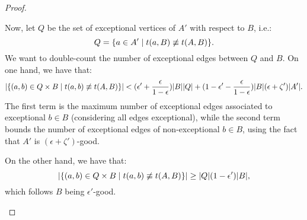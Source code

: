 \begin{lemma}
\begin{proof}
\begin{enumerate}[label=(\alph*), ref=\alph*]
                    Now, let $Q$ be the set of exceptional vertices of $A'$ with respect to $B$, i.e.:
                    \[
                        Q = \{ a \in A' \mid t(a, B) \not\equiv t(A, B) \}.
                    \]
                    We want to double-count the number of exceptional edges between $Q$ and $B$.
                    On one hand, we have that:
                    \[
                        | \{ (a,b) \in Q \times B \mid t(a, b) \not\equiv t(A, B) \} | <
                        ( \epsilon' + \frac{\epsilon}{1 - \epsilon} ) | B | | Q | +
                        ( 1 - \epsilon' - \frac{\epsilon}{1 - \epsilon} ) | B | ( \epsilon + \zeta' ) | A' |.
                    \]
                    The first term is the maximum number of exceptional edges associated to exceptional $b \in B$
                    (considering all edges exceptional), while the second term bounds the number of exceptional edges of
                    non-exceptional $b \in B$, using the fact that $A'$ is $(\epsilon + \zeta')$-good.

                    On the other hand, we have that:
                    \[
                        | \{ (a,b) \in Q \times B \mid t(a, b) \not\equiv t(A, B) \} | \geq
                        | Q | ( 1 - \epsilon' ) | B |,
                    \]
                    which follows $B$ being $\epsilon'$-good.


\end{enumerate}
\end{proof}
\end{lemma}
